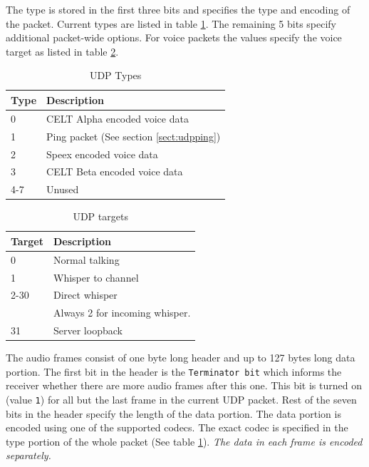 \documentclass[11pt]{article} %
\begin{document}
The type is stored in the first three bits and specifies the type and encoding of the packet. Current types are listed in table \ref{tbl:udptypes}. The remaining 5 bits specify additional packet-wide options. For voice packets the values specify the voice target as listed in table \ref{tbl:udptargets}.

\begin{table}[H]\begin{center}
	\caption{UDP Types}\label{tbl:udptypes}

	\begin{tabular}{ll}
		Type & Description \\
		\hline
		0	& CELT Alpha encoded voice data \\
		1	& Ping packet (See section \ref{sect:udpping}) \\
		2	& Speex encoded voice data \\
		3	& CELT Beta encoded voice data \\
		4-7 & Unused
	\end{tabular}
\end{center}\end{table}

\begin{table}[H]\begin{center}
	\caption{UDP targets}\label{tbl:udptargets}

	\begin{tabular}{ll}
		Target & Description \\
		\hline
		0	& Normal talking \\
		1	& Whisper to channel \\
		2-30	& Direct whisper \\
			& Always 2 for incoming whisper. \\
		31	& Server loopback
	\end{tabular}
\end{center}\end{table}

The audio frames consist of one byte long header and up to 127 bytes long data portion. The first bit in the header is the \texttt{Terminator bit} which informs the receiver whether there are more audio frames after this one. This bit is turned on (value \texttt{1}) for all but the last frame in the current UDP packet. Rest of the seven bits in the header specify the length of the data portion. The data portion is encoded using one of the supported codecs. The exact codec is specified in the type portion of the whole packet (See table \ref{tbl:udptypes}). \emph{The data in each frame is encoded separately.}
\end{document}
